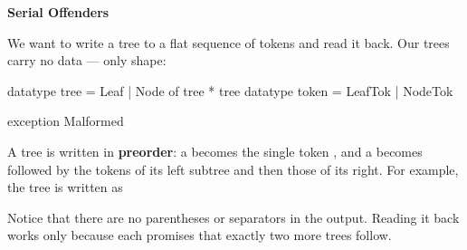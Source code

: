 

\textbf{Serial Offenders}

We want to write a tree to a flat sequence of tokens and read it back. Our trees
carry no data --- only shape:
\begin{codeblock}
  datatype tree  = Leaf | Node of tree * tree
  datatype token = LeafTok | NodeTok

  exception Malformed
\end{codeblock}

A tree is written in \textbf{preorder}: a  becomes the single token
, and a  becomes  followed by the tokens
of its left subtree and then those of its right. For example, the tree
 is written as
\begin{codeblock}
\end{codeblock}

Notice that there are no parentheses or separators in the output. Reading it back
works only because each  promises that exactly two more trees
follow.

